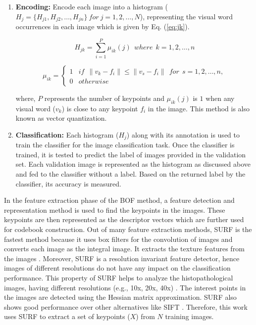 \begin{enumerate}
\item \textbf{Encoding:} Encode each image into a histogram ($H_j=\{H_{j1}, H_{j2}, \dots, H_{jn}\}\ for\  j=1, 2, \dots, N$), representing the visual word occurrences in each image which is given by Eq. (\ref{eq:jk}). 

\begin{equation} \label{eq:jk}
H_{jk}= \sum_{i=1}^P \mu_{ik}(j)  \ \ where \ \ k=1, 2, \dots, n 
\end{equation}

\begin{equation} \label{eq:pk}
\mu_{ik}= \begin{cases}1 & if \ \ \parallel v_k - f_i \parallel \leq \parallel v_s - f_i \parallel \ \ for \ \ s=1,2,\dots, n, \\0 & otherwise\end{cases}
\end{equation}

where, $P$ represents the number of keypoints  and $\mu_{ik}(j)$ is $1$ when any visual word ($v_k$) is close to any keypoint $f_i$ in the image. This method is also known as vector quantization.

\item \textbf{Classification:} Each histogram ($H_j$) along with its annotation is used to train the classifier for the image classification task.  Once the classifier is trained, it is tested to predict the label of images provided in the validation set. Each validation image is represented as the histogram as discussed above and fed to the classifier without a label. Based on the returned label by the classifier, its accuracy is measured.
\end{enumerate}

In the feature extraction phase of the BOF method, a feature detection and representation method is used to find the keypoints in the images. These keypoints are then represented as the descriptor vectors which are further used for codebook construction. Out of many feature extraction methods, SURF is the fastest method because it uses box filters for the convolution of images and converts each image as the integral image. It extracts the texture features from the images \cite{bay2008}. Moreover, SURF is a resolution invariant feature detector, hence images of different resolutions do not have any impact on the classification performance. This property of SURF helps to analyze the histopathological images, having different resolutions (e.g., 10x, 20x, 40x) \cite{xu2013}. The interest points in the images are detected using the Hessian matrix approximation. SURF also shows good performance over other alternatives like SIFT  \cite{juan2009}. Therefore, this work uses SURF to extract a set of keypoints ($X$) from $N$ training images.
        
